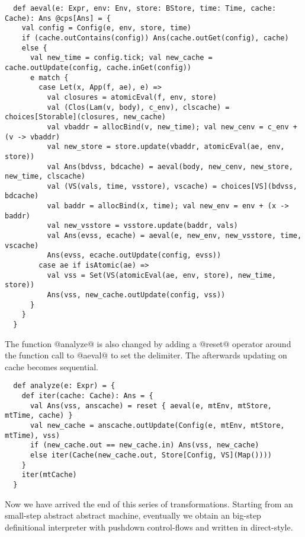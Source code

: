 \documentclass[acmsmall, review]{acmart}\settopmatter{}
\begin{document}
\begin{lstlisting}
  def aeval(e: Expr, env: Env, store: BStore, time: Time, cache: Cache): Ans @cps[Ans] = {
    val config = Config(e, env, store, time)
    if (cache.outContains(config)) Ans(cache.outGet(config), cache)
    else {
      val new_time = config.tick; val new_cache = cache.outUpdate(config, cache.inGet(config))
      e match {
        case Let(x, App(f, ae), e) =>
          val closures = atomicEval(f, env, store)
          val (Clos(Lam(v, body), c_env), clscache) = choices[Storable](closures, new_cache)
          val vbaddr = allocBind(v, new_time); val new_cenv = c_env + (v -> vbaddr)
          val new_store = store.update(vbaddr, atomicEval(ae, env, store))
          val Ans(bdvss, bdcache) = aeval(body, new_cenv, new_store, new_time, clscache)
          val (VS(vals, time, vsstore), vscache) = choices[VS](bdvss, bdcache)
          val baddr = allocBind(x, time); val new_env = env + (x -> baddr)
          val new_vsstore = vsstore.update(baddr, vals)
          val Ans(evss, ecache) = aeval(e, new_env, new_vsstore, time, vscache)
          Ans(evss, ecache.outUpdate(config, evss))
        case ae if isAtomic(ae) =>
          val vss = Set(VS(atomicEval(ae, env, store), new_time, store))
          Ans(vss, new_cache.outUpdate(config, vss))
      }
    }
  }
\end{lstlisting}

The function @analyze@ is also changed by adding a @reset@ operator around the function 
call to @aeval@ to set the delimiter. The afterwards updating on cache becomes sequential.

\begin{lstlisting}
  def analyze(e: Expr) = {
    def iter(cache: Cache): Ans = {
      val Ans(vss, anscache) = reset { aeval(e, mtEnv, mtStore, mtTime, cache) }
      val new_cache = anscache.outUpdate(Config(e, mtEnv, mtStore, mtTime), vss)
      if (new_cache.out == new_cache.in) Ans(vss, new_cache)
      else iter(Cache(new_cache.out, Store[Config, VS](Map())))
    }
    iter(mtCache)
  }
\end{lstlisting}

Now we have arrived the end of this series of transformations. Starting from an 
small-step abstract abstract machine, eventually we obtain an big-step definitional
interpreter with pushdown control-flows and written in direct-style.

\end{document}
